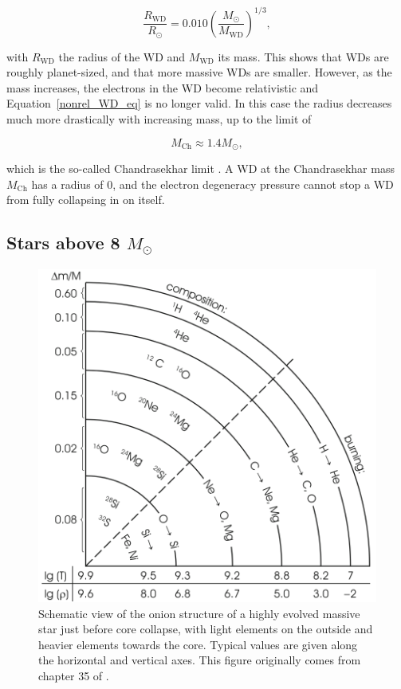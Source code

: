 \documentclass[a4paper,oneside,12pt, class=Latex/Classes/PhDthesisPSnPDF, crop=false]{standalone}
\begin{document}
\begin{equation}
    \label{nonrel_WD_eq}
    \frac{R_\text{WD}}{R_\odot} = 0.010 \left(\frac{M_\odot}{M_\text{WD}}\right)^{1/3},
\end{equation}

with $R_\text{WD}$ the radius of the WD and $M_\text{WD}$ its mass. This shows that WDs are roughly planet-sized, and that more massive WDs are smaller. However, as the mass increases, the electrons in the WD become relativistic and Equation~\ref{nonrel_WD_eq} is no longer valid. In this case the radius decreases much more drastically with increasing mass, up to the limit of 

\begin{equation}
    \label{Chandrasekhar_lim}
    M_\text{Ch} \approx 1.4 M_\odot,
\end{equation}

which is the so-called Chandrasekhar limit \citep{Chandrasekhar_lim}. A WD at the Chandrasekhar mass $M_\text{Ch}$ has a radius of 0, and the electron degeneracy pressure cannot stop a WD from fully collapsing in on itself.


\subsection{Stars above 8 $M_\odot$}
\label{ge_8_Msol}

\begin{figure}
    \centering
    \includegraphics[width=\textwidth]{../Images/chapter_1/starstruct.png}
    \caption[Schematic view of the onion structure of a highly evolved massive star.]{Schematic view of the onion structure of a highly evolved massive star just before core collapse, with light elements on the outside and heavier elements towards the core. Typical values are given along the horizontal and vertical axes. This figure originally comes from chapter 35 of \citet{starstruct}.}
    \label{startstruct}
\end{figure}
\end{document}
